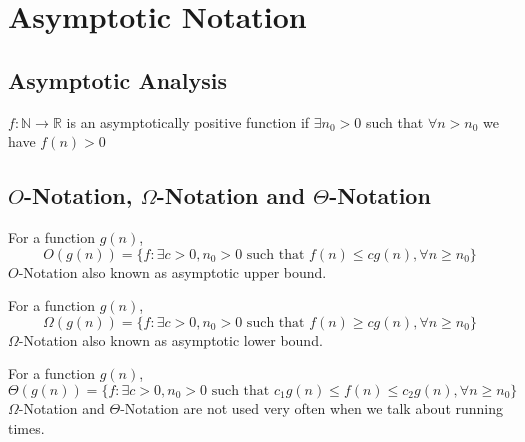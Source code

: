 			\section{Asymptotic Notation}
				\subsection{Asymptotic Analysis}
					\begin{definition}
						$f: \mathbb{N} \rightarrow \mathbb{R}$ is an asymptotically positive function if $\exists n_0 > 0$ such that $\forall n > n_0$ we have $f(n) > 0$
					\end{definition}

				\subsection{\texorpdfstring{$O$}{O}-Notation, \texorpdfstring{$\Omega$}{Omega}-Notation and \texorpdfstring{$\Theta$}{Theta}-Notation}
					\begin{definition}[$O$-Notation]
						For a function $g(n)$, 
						\begin{equation*}
							O(g(n)) = \{f: \exists c > 0, n_0 > 0 \text{ such that } f(n) \le cg(n), \forall n\ge n_0\}
						\end{equation*}
						$O$-Notation also known as asymptotic upper bound. 
					\end{definition}				

					\begin{definition}
						For a function $g(n)$, 
						\begin{equation*}
							\Omega(g(n)) = \{f: \exists c > 0, n_0 > 0 \text{ such that } f(n) \ge cg(n), \forall n\ge n_0\}
						\end{equation*}
						$\Omega$-Notation also known as asymptotic lower bound.
					\end{definition}
					
					\begin{definition}
						For a function $g(n)$, 
						\begin{equation*}
							\Theta(g(n)) = \{f: \exists c > 0, n_0 > 0 \text{ such that }  c_1g(n) \le f(n) \le c_2g(n), \forall n\ge n_0\}
						\end{equation*}
						$\Omega$-Notation and $\Theta$-Notation are not used very often when we talk about running times.
					\end{definition}
					
